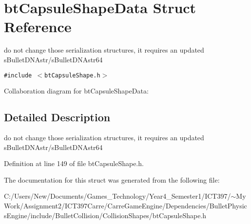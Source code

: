 \hypertarget{structbt_capsule_shape_data}{
\section{btCapsuleShapeData Struct Reference}
\label{structbt_capsule_shape_data}
}
do not change those serialization structures, it requires an updated sBulletDNAstr/sBulletDNAstr64  


{\tt \#include $<$btCapsuleShape.h$>$}

Collaboration diagram for btCapsuleShapeData:

\subsection{Detailed Description}
do not change those serialization structures, it requires an updated sBulletDNAstr/sBulletDNAstr64 

Definition at line 149 of file btCapsuleShape.h.

The documentation for this struct was generated from the following file:\begin{CompactItemize}
\item 
C:/Users/New/Documents/Games\_\-Technology/Year4\_\-Semester1/ICT397/$\sim$My Work/Assignment2/ICT397Carre/CarreGameEngine/Dependencies/BulletPhysicsEngine/include/BulletCollision/CollisionShapes/btCapsuleShape.h\end{CompactItemize}
